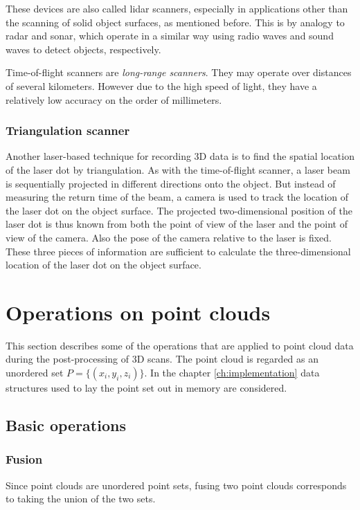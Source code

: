 These devices are also called \gls{lidar} scanners, especially in applications other than the scanning of solid object surfaces, as mentioned before. This is by analogy to \gls{radar} and \gls{sonar}, which operate in a similar way using radio waves and sound waves to detect objects, respectively.

Time-of-flight scanners are \emph{long-range scanners}. They may operate over distances of several kilometers. However due to the high speed of light, they have a relatively low accuracy on the order of millimeters.

\subsubsection{Triangulation scanner}
Another laser-based technique for recording 3D data is to find the spatial location of the laser dot by triangulation. As with the time-of-flight scanner, a laser beam is sequentially projected in different directions onto the object. But instead of measuring the return time of the beam, a camera is used to track the location of the laser dot on the object surface. The projected two-dimensional position of the laser dot is thus known from both the point of view of the laser and the point of view of the camera. Also the pose of the camera relative to the laser is fixed. These three pieces of information are sufficient to calculate the three-dimensional location of the laser dot on the object surface.


\section{Operations on point clouds}
This section describes some of the operations that are applied to point cloud data during the post-processing of 3D scans. The point cloud is regarded as an unordered set $P = \{ (x_i, y_i, z_i) \}$. In the chapter \ref{ch:implementation} data structures used to lay the point set out in memory are considered.


\subsection{Basic operations}

\subsubsection{Fusion}
Since point clouds are unordered point sets, fusing two point clouds corresponds to taking the union of the two sets.

